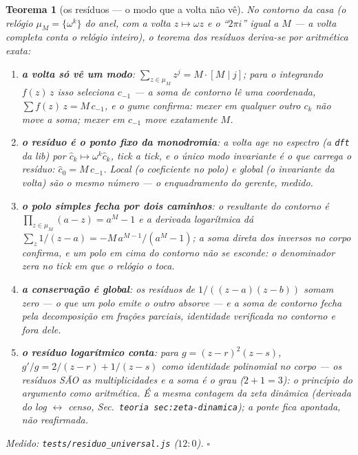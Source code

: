 \documentclass[11pt,a4paper]{article}
\newtheorem{teorema}{Teorema}
\newcommand{\code}[1]{\texttt{\small #1}}
\newcommand{\leitura}[1]{\code{#1}}
\begin{document}
\begin{teorema}[os res\'iduos --- o modo que a volta n\~ao v\^e]\label{thm:residuo}
No contorno da casa (o rel\'ogio $\mu_{M}=\{\omega^{k}\}$ do anel,
com a volta $z\mapsto\omega z$ e o ``$2\pi i$'' igual a $M$ --- a
volta completa conta o rel\'ogio inteiro), o teorema dos res\'iduos
deriva-se por aritm\'etica exata:
\begin{enumerate}
\item \textbf{a volta s\'o v\^e um modo}:
$\sum_{z\in\mu_{M}}z^{j}=M\cdot[M\mid j]$; para o integrando
$f(z)\,z$ isso seleciona $c_{-1}$ --- a soma de contorno l\^e
\emph{uma} coordenada, $\sum f(z)\,z=M\,c_{-1}$, e o gume confirma:
mexer em qualquer outro $c_{k}$ n\~ao move a soma; mexer em $c_{-1}$
move exatamente $M$.
\item \textbf{o res\'iduo \'e o ponto fixo da monodromia}: a volta
age no espectro (a \code{dft} da lib) por
$\hat{c}_{k}\mapsto\omega^{k}\hat{c}_{k}$, tick a tick, e o
\'unico modo invariante \'e o que carrega o res\'iduo:
$\hat{c}_{0}=M\,c_{-1}$. \emph{Local} (o coeficiente no polo) e
\emph{global} (o invariante da volta) s\~ao o mesmo n\'umero --- o
enquadramento do gerente, medido.
\item \textbf{o polo simples fecha por dois caminhos}: o resultante
do contorno \'e $\prod_{z\in\mu_{M}}(a-z)=a^{M}-1$ e a derivada
logar\'itmica d\'a $\sum_{z}1/(z-a)=-M\,a^{M-1}/(a^{M}-1)$; a soma
direta dos inversos no corpo confirma, e um polo \emph{em cima} do
contorno n\~ao se esconde: o denominador zera no tick em que o
rel\'ogio o toca.
\item \textbf{a conserva\c{c}\~ao \'e global}: os res\'iduos de
$1/((z-a)(z-b))$ somam \emph{zero} --- o que um polo emite o outro
absorve --- e a soma de contorno fecha pela decomposi\c{c}\~ao em
fra\c{c}\~oes parciais, identidade verificada no contorno e fora
dele.
\item \textbf{o res\'iduo logar\'itmico conta}: para
$g=(z-r)^{2}(z-s)$, $g'/g=2/(z-r)+1/(z-s)$ como identidade
polinomial no corpo --- os res\'iduos S\~AO as multiplicidades e a
soma \'e o grau ($2+1=3$): o princ\'ipio do argumento como
aritm\'etica. \'E a mesma contagem da zeta din\^amica (derivada do
log $\leftrightarrow$ censo, Sec.~\leitura{teoria sec:zeta-dinamica}); a ponte
fica apontada, n\~ao reafirmada.
\end{enumerate}
\emph{Medido:} \code{tests/residuo\_universal.js} ($12{:}0$).
$\square$
\end{teorema}
\end{document}
